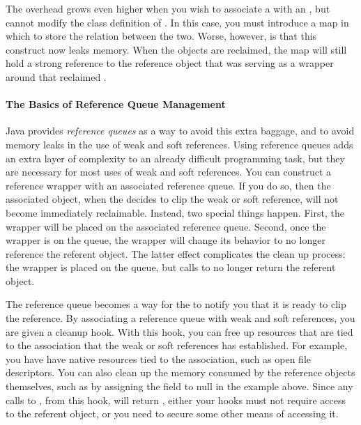The overhead grows even higher when you wish to associate a 
with an , but cannot modify the class definition of . In this case, you
must introduce a map in which to store the relation between the two. Worse,
however, is that this construct now leaks memory. When the  objects are
reclaimed, the map will still hold a strong reference to the reference object
that was serving as a wrapper around that reclaimed .

\paragraph{The Basics of Reference Queue Management}
\label{sec:reference-queue-basics}

Java provides \emph{reference queues} as a way to avoid this extra baggage, and
to avoid memory leaks in the use of weak and soft references. Using reference
queues adds an extra layer of complexity to an already difficult programming
task, but they are necessary for most uses of weak and soft references. You can
construct a reference wrapper with an associated reference queue. If you do so,
then the associated object, when the \jre decides to clip the weak or soft
reference, will not become immediately reclaimable. Instead, two special things
happen. First, the wrapper will be placed on the associated reference queue.
Second, once the wrapper is on the queue, the wrapper will change its behavior to
no longer reference the referent object. The latter effect complicates the clean
up process: the wrapper is placed on the queue, but calls to  no longer
return the referent object. 

The reference queue becomes a way for the \jre to notify you that it is ready to
clip the reference.  By associating a reference queue with weak and soft
references, you are given a cleanup hook.
With this hook, you can free up resources that are tied to the association that
the weak or soft references has established. For example, you have have native
resources tied to the association, such as open file descriptors. You can also
clean up the memory consumed by the reference objects themselves, such as by
assigning the  field to null in the example above. Since
any calls to , from this hook, will return , either your
hooks must not require access to the referent object, or you need to secure some
other means of accessing it.


